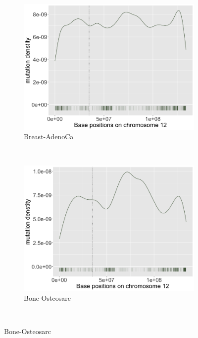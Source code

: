 \begin{figure}[ht!]
    \begin{subfigure}{.5\textwidth}
    \includegraphics[width=\linewidth,height=0.6\textwidth]{graphics/mutdistribution_Breast-AdenoCa.png}
    \caption{Breast-AdenoCa}
    \end{subfigure}
    ~
    \begin{subfigure}{.5\textwidth}
    \includegraphics[width=\linewidth,height=0.6\textwidth]{graphics/mutdistribution_Bone-Osteosarc.png}
    \caption{Bone-Osteosarc}
    \end{subfigure} \\
    \vspace{0.2cm}
    

\end{figure}
